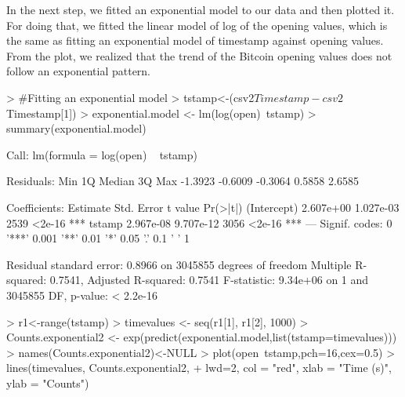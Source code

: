\documentclass{article}
\begin{document}
In the next step, we fitted an exponential model to our data and then plotted it. For doing that, we fitted the linear model of log of the opening values, which is the same as fitting an exponential model of timestamp against opening values. From the plot, we realized that the trend of the Bitcoin opening values does not follow an exponential pattern.
\begin{Schunk}
\begin{Sinput}
> #Fitting an exponential model
> tstamp<-(csv2$Timestamp-csv2$Timestamp[1])
> exponential.model <- lm(log(open)~tstamp)
> summary(exponential.model)
\end{Sinput}
\begin{Soutput}
Call:
lm(formula = log(open) ~ tstamp)

Residuals:
    Min      1Q  Median      3Q     Max 
-1.3923 -0.6009 -0.3064  0.5858  2.6585 

Coefficients:
             Estimate Std. Error t value Pr(>|t|)    
(Intercept) 2.607e+00  1.027e-03    2539   <2e-16 ***
tstamp      2.967e-08  9.707e-12    3056   <2e-16 ***
---
Signif. codes:  0 '***' 0.001 '**' 0.01 '*' 0.05 '.' 0.1 ' ' 1

Residual standard error: 0.8966 on 3045855 degrees of freedom
Multiple R-squared:  0.7541,	Adjusted R-squared:  0.7541 
F-statistic: 9.34e+06 on 1 and 3045855 DF,  p-value: < 2.2e-16
\end{Soutput}
\end{Schunk}
\begin{Schunk}
\begin{Sinput}
> r1<-range(tstamp)
> timevalues <- seq(r1[1], r1[2], 1000)
> Counts.exponential2 <- exp(predict(exponential.model,list(tstamp=timevalues)))
> names(Counts.exponential2)<-NULL
> plot(open~tstamp,pch=16,cex=0.5)
> lines(timevalues, Counts.exponential2,
+       lwd=2, col = "red", xlab = "Time (s)", ylab = "Counts")
\end{Sinput}
\end{Schunk}
\end{document}

